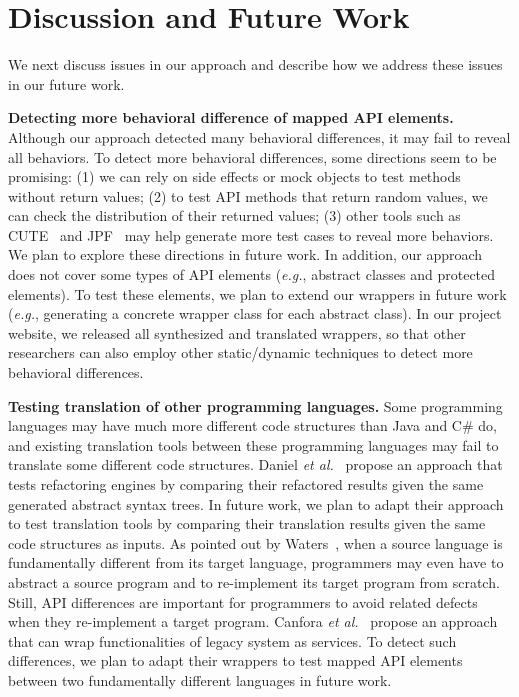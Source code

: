 

\section{Discussion and Future Work}
\label{sec:discuss}

We next discuss issues in our approach and describe how we address
these issues in our future work.

\textbf{Detecting more behavioral difference of mapped API elements.} Although our approach detected many behavioral differences, it may fail to reveal all behaviors. To detect more behavioral differences, some directions seem to be promising: (1) we can rely on side effects or  mock objects to test methods without return values; (2) to test API methods that return random values, we can check the distribution of their returned values; (3) other tools such as CUTE~\cite{koushik:cute} and JPF~\cite{visser2003mcp} may help generate more test cases to reveal more behaviors. We plan to explore these directions in future work. In addition, our approach does not cover some types of API elements (\emph{e.g.}, abstract classes and protected elements). To test these elements, we plan to extend our wrappers in future work (\emph{e.g.}, generating a concrete wrapper class for each abstract class). In our project website, we released all synthesized and translated wrappers, so that other researchers can also employ other static/dynamic techniques to detect more behavioral differences.

\textbf{Testing translation of other programming languages.} Some programming languages may have much more different code structures than Java and C\# do, and existing translation tools between these programming languages may fail to translate some different code structures. Daniel \emph{et al.}~\cite{daniel2007automated} propose an approach that tests refactoring engines by comparing their refactored results given the same generated abstract syntax trees. In future work, we plan to adapt their approach to test translation tools by comparing their translation results given the same code structures as inputs. As pointed out by Waters~\cite{waters1988program}, when a source language is fundamentally different from its target language, programmers may even have to abstract a source program and to re-implement its target program from scratch. Still, API differences are important for programmers to avoid related defects when they re-implement a target program. Canfora \emph{et al.}~\cite{CanforaFFT08} propose an approach that can wrap functionalities of legacy system as services. To detect such differences, we plan to adapt their wrappers to test mapped API elements between two fundamentally different languages in future work.

